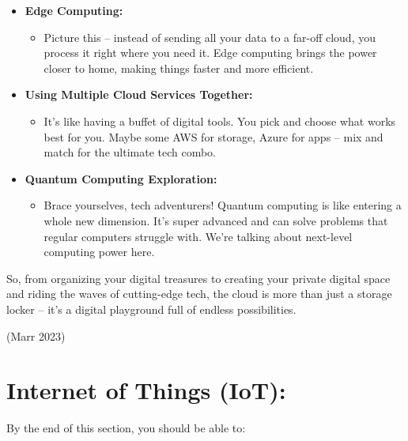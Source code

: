 \documentclass[
  letterpaper,
  DIV=11,
  numbers=noendperiod]{scrreprt}
\providecommand{\tightlist}{%
  \setlength{\itemsep}{0pt}\setlength{\parskip}{0pt}}\usepackage{longtable,booktabs,array}
\begin{document}
\begin{itemize}
\item
  \textbf{Edge Computing:}

  \begin{itemize}
  \tightlist
  \item
    Picture this -- instead of sending all your data to a far-off cloud,
    you process it right where you need it. Edge computing brings the
    power closer to home, making things faster and more efficient.
  \end{itemize}
\item
  \textbf{Using Multiple Cloud Services Together:}

  \begin{itemize}
  \tightlist
  \item
    It's like having a buffet of digital tools. You pick and choose what
    works best for you. Maybe some AWS for storage, Azure for apps --
    mix and match for the ultimate tech combo.
  \end{itemize}
\item
  \textbf{Quantum Computing Exploration:}

  \begin{itemize}
  \tightlist
  \item
    Brace yourselves, tech adventurers! Quantum computing is like
    entering a whole new dimension. It's super advanced and can solve
    problems that regular computers struggle with. We're talking about
    next-level computing power here.
  \end{itemize}
\end{itemize}

So, from organizing your digital treasures to creating your private
digital space and riding the waves of cutting-edge tech, the cloud is
more than just a storage locker -- it's a digital playground full of
endless possibilities.

(Marr 2023)

\section{Internet of Things (IoT):}\label{internet-of-things-iot}

By the end of this section, you should be able to:
\end{document}
